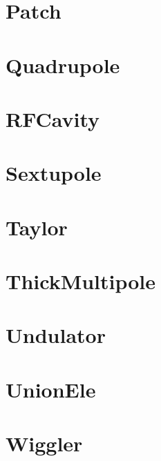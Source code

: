 \section{Patch}
\label{s:patch}


\section{Quadrupole}
\label{s:quad}


\section{RFCavity}
\label{s:rfcav}


\section{Sextupole}
\label{s:sex}


\section{Taylor}
\label{s:taylor}


\section{ThickMultipole}
\label{s:thickmult}


\section{Undulator}
\label{s:undulator}


\section{UnionEle}
\label{s:unionele}


\section{Wiggler}
\label{s:wiggler}


